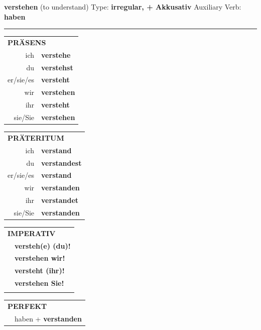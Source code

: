 \documentclass[10pt,a4paper]{revtex4-2}
\begin{document}
\begin{verbbox-acc}
    {\Large \bf verstehen} (to understand) \hfill Type: \textbf{irregular, + Akkusativ} \hfill Auxiliary Verb: \textbf{haben} 
    
     \vspace{5pt}

    \hrule
    
    \vspace{5pt}

  \begin{tabular}{rl}
     \multicolumn{2}{l}{\textbf{PRÄSENS} }\\
    ich & \textbf{verstehe}\\
    du & \textbf{verstehst}\\
    er/sie/es & \textbf{versteht}\\
    wir & \textbf{verstehen}\\
    ihr & \textbf{versteht}\\
    sie/Sie & \textbf{verstehen}\\
  \end{tabular}
  \hfill
     \begin{tabular}{rl}
    \multicolumn{2}{l}{\textbf{PRÄTERITUM} }\\
    ich & \textbf{verstand}\\
    du & \textbf{verstandest}\\
    er/sie/es & \textbf{verstand}\\
    wir & \textbf{verstanden}\\
    ihr & \textbf{verstandet}\\
    sie/Sie & \textbf{verstanden}\\
  \end{tabular}
  \hfill
  \begin{tabular}{rl}
     \multicolumn{2}{l}{\textbf{IMPERATIV} }\\
   & \textbf{versteh(e) (du)!}\\
   & \textbf{verstehen wir!}\\
   & \textbf{versteht (ihr)!}\\
   & \textbf{verstehen Sie!}\\
   & \vspace{10pt}
  \end{tabular}

    \vspace{10pt}

 \begin{tabular}{rl}
     \multicolumn{2}{l}{\textbf{PERFEKT}}\\
  &  haben + \textbf{verstanden}\\
  \end{tabular}
\hfill
   \begin{tabular}{rl}
   

\end{tabular}
\end{verbbox-acc}
\end{document}
